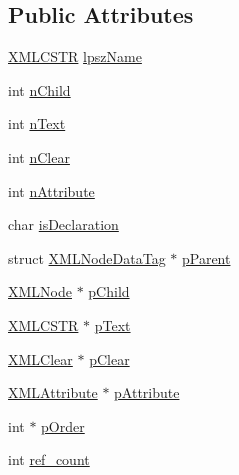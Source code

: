 \subsection*{Public Attributes}
\begin{DoxyCompactItemize}
\item 
\hyperlink{xmlParser_8h_acdb0d6fd8dd596384b438d86cfb2b182}{X\-M\-L\-C\-S\-T\-R} \hyperlink{structXMLNode_1_1XMLNodeDataTag_a0a192e9b0bb99b776ad988109b292206}{lpsz\-Name}
\item 
int \hyperlink{structXMLNode_1_1XMLNodeDataTag_a04bab521d6ff1e4644468cd8090530ce}{n\-Child}
\item 
int \hyperlink{structXMLNode_1_1XMLNodeDataTag_ace4ec863994d39bc5cb0acf84cbb43d1}{n\-Text}
\item 
int \hyperlink{structXMLNode_1_1XMLNodeDataTag_aef6eed6eb052360cdaca01db58d8c377}{n\-Clear}
\item 
int \hyperlink{structXMLNode_1_1XMLNodeDataTag_afc265fac21f1f54ef2a9729d785106bf}{n\-Attribute}
\item 
char \hyperlink{structXMLNode_1_1XMLNodeDataTag_aa35a0ff4251d0d0d266c1a34d5fdfa1b}{is\-Declaration}
\item 
struct \hyperlink{structXMLNode_1_1XMLNodeDataTag}{X\-M\-L\-Node\-Data\-Tag} $\ast$ \hyperlink{structXMLNode_1_1XMLNodeDataTag_aec72ce3701f4b42f2b9ea73d7edcfb32}{p\-Parent}
\item 
\hyperlink{structXMLNode}{X\-M\-L\-Node} $\ast$ \hyperlink{structXMLNode_1_1XMLNodeDataTag_abbe8b236c3f33c78184e06f76dc0cb08}{p\-Child}
\item 
\hyperlink{xmlParser_8h_acdb0d6fd8dd596384b438d86cfb2b182}{X\-M\-L\-C\-S\-T\-R} $\ast$ \hyperlink{structXMLNode_1_1XMLNodeDataTag_a49a90f30757f9a7e778ac7a960c32546}{p\-Text}
\item 
\hyperlink{structXMLClear}{X\-M\-L\-Clear} $\ast$ \hyperlink{structXMLNode_1_1XMLNodeDataTag_aa7628a478ecef051f1de900efe805193}{p\-Clear}
\item 
\hyperlink{structXMLAttribute}{X\-M\-L\-Attribute} $\ast$ \hyperlink{structXMLNode_1_1XMLNodeDataTag_a163b01a6c240bfe901273183decec34d}{p\-Attribute}
\item 
int $\ast$ \hyperlink{structXMLNode_1_1XMLNodeDataTag_a030e9e8acf2373bd2a3865161d3aa345}{p\-Order}
\item 
int \hyperlink{structXMLNode_1_1XMLNodeDataTag_a075384a405d8afe7de14982b1526912d}{ref\-\_\-count}
\end{DoxyCompactItemize}


